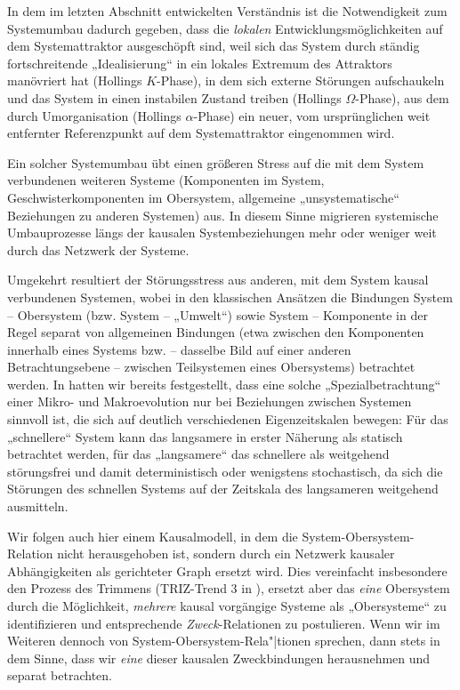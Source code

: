 \documentclass[12pt,a4paper]{article}
\begin{document}
In dem im letzten Abschnitt entwickelten Verständnis ist die Notwendigkeit zum
Systemumbau dadurch gegeben, dass die \emph{lokalen} Entwicklungsmöglichkeiten
auf dem Systemattraktor ausgeschöpft sind, weil sich das System durch ständig
fortschreitende „Idealisierung“ in ein lokales Extremum des Attraktors
manövriert hat (Hollings $K$-Phase), in dem sich externe Störungen
aufschaukeln und das System in einen instabilen Zustand treiben (Hollings
$\Omega$-Phase), aus dem durch Umorganisation (Hollings $\alpha$-Phase) ein
neuer, vom ursprünglichen weit entfernter Referenzpunkt auf dem
Systemattraktor eingenommen wird.

Ein solcher Systemumbau übt einen größeren Stress auf die mit dem System
verbundenen weiteren Systeme (Komponenten im System, Geschwisterkomponenten im
Obersystem, allgemeine „unsystematische“ Beziehungen zu anderen Systemen) aus.
In diesem Sinne migrieren systemische Umbauprozesse längs der kausalen
Systembeziehungen mehr oder weniger weit durch das Netzwerk der Systeme.

Umgekehrt resultiert der Störungsstress aus anderen, mit dem System kausal
verbundenen Systemen, wobei in den klassischen Ansätzen die Bindungen System
-- Obersystem (bzw. System -- „Umwelt“) sowie System -- Komponente in der
Regel separat von allgemeinen Bindungen (etwa zwischen den Komponenten
innerhalb eines Systems bzw. -- dasselbe Bild auf einer anderen
Betrachtungsebene -- zwischen Teilsystemen eines Obersystems) betrachtet
werden. In \cite{Graebe2020a} hatten wir bereits festgestellt, dass eine
solche „Spezialbetrachtung“ einer Mikro- und Makroevolution nur bei
Beziehungen zwischen Systemen sinnvoll ist, die sich auf deutlich
verschiedenen Eigenzeitskalen bewegen: Für das „schnellere“ System kann das
langsamere in erster Näherung als statisch betrachtet werden, für das
„langsamere“ das schnellere als weitgehend störungsfrei und damit
deterministisch oder wenigstens stochastisch, da sich die Störungen des
schnellen Systems auf der Zeitskala des langsameren weitgehend ausmitteln.

Wir folgen auch hier einem Kausalmodell, in dem die System-Obersystem-Relation
nicht herausgehoben ist, sondern durch ein Netzwerk kausaler Abhängigkeiten
als gerichteter Graph ersetzt wird. Dies vereinfacht insbesondere den Prozess
des Trimmens (TRIZ-Trend 3 in \cite{TESE2018}), ersetzt aber das \emph{eine}
Obersystem durch die Möglichkeit, \emph{mehrere} kausal vorgängige Systeme als
„Obersysteme“ zu identifizieren und entsprechende \emph{Zweck}-Relationen zu
postulieren.  Wenn wir im Weiteren dennoch von System-Obersystem-Rela"|tionen
sprechen, dann stets in dem Sinne, dass wir \emph{eine} dieser kausalen
Zweckbindungen herausnehmen und separat betrachten. 
\end{document}
